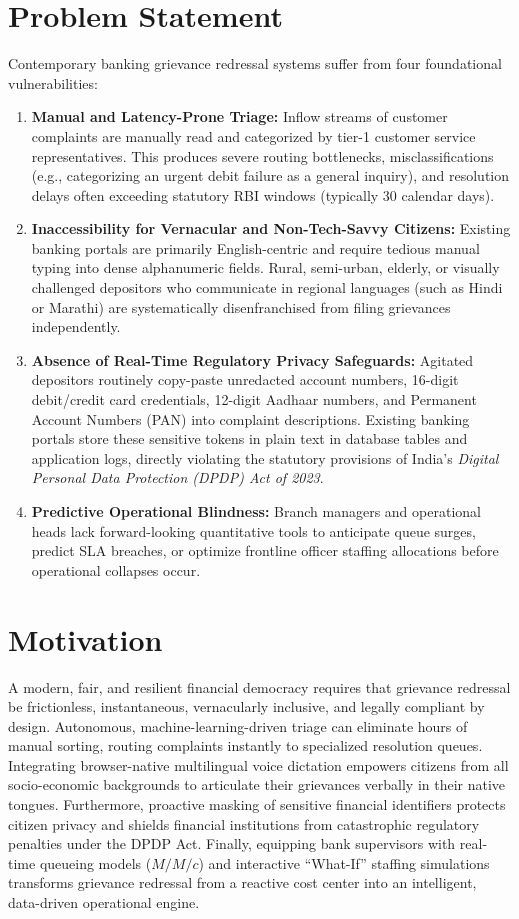 \section{Problem Statement}
Contemporary banking grievance redressal systems suffer from four foundational vulnerabilities:
\begin{enumerate}
    \item \textbf{Manual and Latency-Prone Triage:} Inflow streams of customer complaints are manually read and categorized by tier-1 customer service representatives. This produces severe routing bottlenecks, misclassifications (e.g., categorizing an urgent debit failure as a general inquiry), and resolution delays often exceeding statutory RBI windows (typically 30 calendar days).
    \item \textbf{Inaccessibility for Vernacular and Non-Tech-Savvy Citizens:} Existing banking portals are primarily English-centric and require tedious manual typing into dense alphanumeric fields. Rural, semi-urban, elderly, or visually challenged depositors who communicate in regional languages (such as Hindi or Marathi) are systematically disenfranchised from filing grievances independently.
    \item \textbf{Absence of Real-Time Regulatory Privacy Safeguards:} Agitated depositors routinely copy-paste unredacted account numbers, 16-digit debit/credit card credentials, 12-digit Aadhaar numbers, and Permanent Account Numbers (PAN) into complaint descriptions. Existing banking portals store these sensitive tokens in plain text in database tables and application logs, directly violating the statutory provisions of India's \textit{Digital Personal Data Protection (DPDP) Act of 2023}.
    \item \textbf{Predictive Operational Blindness:} Branch managers and operational heads lack forward-looking quantitative tools to anticipate queue surges, predict SLA breaches, or optimize frontline officer staffing allocations before operational collapses occur.
\end{enumerate}

\section{Motivation}
A modern, fair, and resilient financial democracy requires that grievance redressal be frictionless, instantaneous, vernacularly inclusive, and legally compliant by design. Autonomous, machine-learning-driven triage can eliminate hours of manual sorting, routing complaints instantly to specialized resolution queues. Integrating browser-native multilingual voice dictation empowers citizens from all socio-economic backgrounds to articulate their grievances verbally in their native tongues. Furthermore, proactive masking of sensitive financial identifiers protects citizen privacy and shields financial institutions from catastrophic regulatory penalties under the DPDP Act. Finally, equipping bank supervisors with real-time queueing models ($M/M/c$) and interactive ``What-If'' staffing simulations transforms grievance redressal from a reactive cost center into an intelligent, data-driven operational engine.

